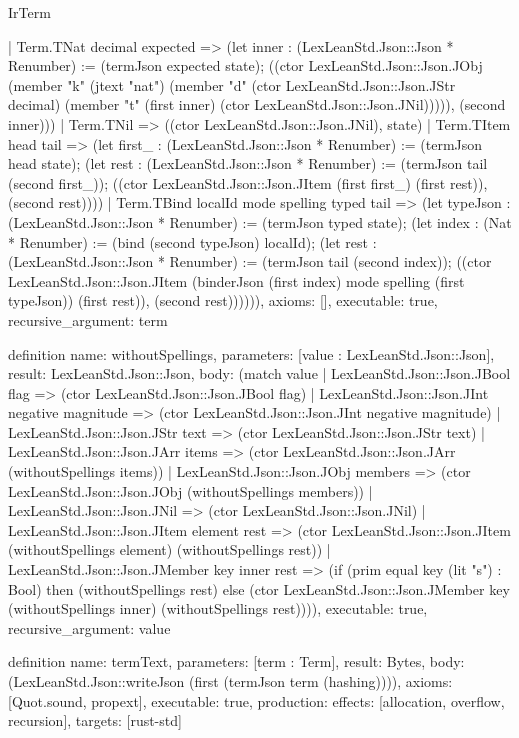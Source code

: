 \begin{lexlean}{IrTerm}
\begin{semanticmodule}
{    | Term.TNat decimal expected => (let inner : (LexLeanStd.Json::Json * Renumber) := (termJson expected state); ((ctor LexLeanStd.Json::Json.JObj (member "k" (jtext "nat") (member "d" (ctor LexLeanStd.Json::Json.JStr decimal) (member "t" (first inner) (ctor LexLeanStd.Json::Json.JNil))))), (second inner)))
    | Term.TNil => ((ctor LexLeanStd.Json::Json.JNil), state)
    | Term.TItem head tail => (let first_ : (LexLeanStd.Json::Json * Renumber) := (termJson head state); (let rest : (LexLeanStd.Json::Json * Renumber) := (termJson tail (second first_)); ((ctor LexLeanStd.Json::Json.JItem (first first_) (first rest)), (second rest))))
    | Term.TBind localId mode spelling typed tail => (let typeJson : (LexLeanStd.Json::Json * Renumber) := (termJson typed state); (let index : (Nat * Renumber) := (bind (second typeJson) localId); (let rest : (LexLeanStd.Json::Json * Renumber) := (termJson tail (second index)); ((ctor LexLeanStd.Json::Json.JItem (binderJson (first index) mode spelling (first typeJson)) (first rest)), (second rest)))))),
  axioms: [],
  executable: true,
  recursive_argument: term
}

definition{
  name: withoutSpellings,
  parameters: [value : LexLeanStd.Json::Json],
  result: LexLeanStd.Json::Json,
  body: (match value
    | LexLeanStd.Json::Json.JBool flag => (ctor LexLeanStd.Json::Json.JBool flag)
    | LexLeanStd.Json::Json.JInt negative magnitude => (ctor LexLeanStd.Json::Json.JInt negative magnitude)
    | LexLeanStd.Json::Json.JStr text => (ctor LexLeanStd.Json::Json.JStr text)
    | LexLeanStd.Json::Json.JArr items => (ctor LexLeanStd.Json::Json.JArr (withoutSpellings items))
    | LexLeanStd.Json::Json.JObj members => (ctor LexLeanStd.Json::Json.JObj (withoutSpellings members))
    | LexLeanStd.Json::Json.JNil => (ctor LexLeanStd.Json::Json.JNil)
    | LexLeanStd.Json::Json.JItem element rest => (ctor LexLeanStd.Json::Json.JItem (withoutSpellings element) (withoutSpellings rest))
    | LexLeanStd.Json::Json.JMember key inner rest => (if (prim equal key (lit "s") : Bool) then (withoutSpellings rest) else (ctor LexLeanStd.Json::Json.JMember key (withoutSpellings inner) (withoutSpellings rest)))),
  executable: true,
  recursive_argument: value
}

definition{
  name: termText,
  parameters: [term : Term],
  result: Bytes,
  body: (LexLeanStd.Json::writeJson (first (termJson term (hashing)))),
  axioms: [Quot.sound, propext],
  executable: true,
  production: {effects: [allocation, overflow, recursion], targets: [rust-std]}
}


\end{semanticmodule}
\end{lexlean}
